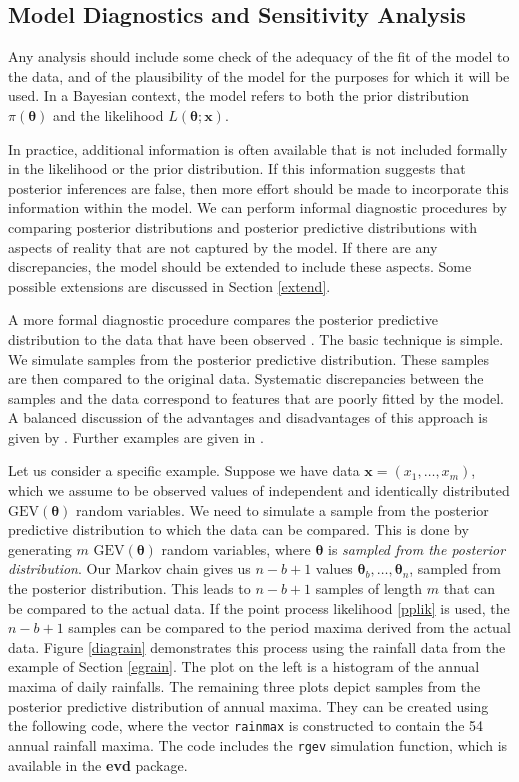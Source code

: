 \documentclass[11pt,a4paper]{article}
\newcommand{\bs}{\boldsymbol}
\begin{document}
\subsection{Model Diagnostics and Sensitivity Analysis}
\label{diag}

Any analysis should include some check of the adequacy of the fit of the model to the data, and of the plausibility of the model for the purposes for which it will be used.
In a Bayesian context, the model refers to both the prior distribution $\pi(\bs{\theta})$ and the likelihood $L(\bs{\theta};\bs{x})$.

In practice, additional information is often available that is not included formally in the likelihood or the prior distribution.
If this information suggests that posterior inferences are false, then more effort should be made to incorporate this information within the model.
We can perform informal diagnostic procedures by comparing posterior distributions and posterior predictive distributions with aspects of reality that are not captured by the model.
If there are any discrepancies, the model should be extended to include these aspects.
Some possible extensions are discussed in Section \ref{extend}.

A more formal diagnostic procedure compares the posterior predictive distribution to the data that have been observed \citep{gelmcarl95}.
The basic technique is simple.
We simulate samples from the posterior predictive distribution.
These samples are then compared to the original data.
Systematic discrepancies between the samples and the data correspond to features that are poorly fitted by the model.
A balanced discussion of the advantages and disadvantages of this approach is given by \citet{bayaberg99, bayaberg00}.
Further examples are given in \citet{gelmmengster96}.

Let us consider a specific example.
Suppose we have data $\bs{x} = (x_1,\dots,x_m)$, which we assume to be observed values of independent and identically distributed $\text{GEV}(\bs{\theta})$ random variables.
We need to simulate a sample from the posterior predictive distribution to which the data can be compared.
This is done by generating $m$ $\text{GEV}(\bs{\theta})$ random variables, where $\bs{\theta}$ is \emph{sampled from the posterior distribution}.
Our Markov chain gives us $n-b+1$ values $\bs{\theta}_b, \dots, \bs{\theta}_n$, sampled from the posterior distribution.
This leads to $n-b+1$ samples of length $m$ that can be compared to the actual data.
If the point process likelihood \eqref{pplik} is used, the $n-b+1$ samples can be compared to the period maxima derived from the actual data.
Figure \ref{diagrain} demonstrates this process using the rainfall data from the example of Section \ref{egrain}.
The plot on the left is a histogram of the annual maxima of daily rainfalls.
The remaining three plots depict samples from the posterior predictive distribution of annual maxima. 
They can be created using the following code, where the vector \verb+rainmax+ is constructed to contain the 54 annual rainfall maxima.
The code includes the \verb+rgev+ simulation function, which is available in the \textbf{evd} package.
\end{document}
